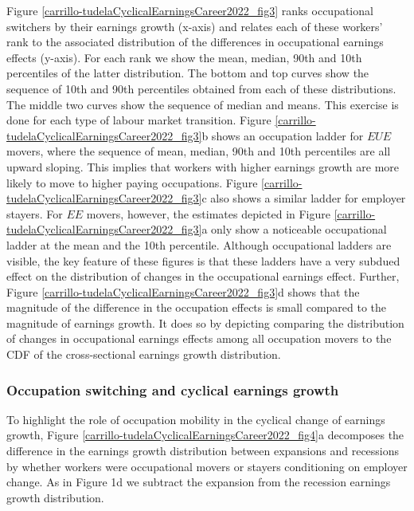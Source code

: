\documentclass[12pt]{article}
\newcommand{\highlightP}[1]{{\emph{\color{MyPink}{#1}}}}
\newcommand{\highlightPP}[1]{{\emph{\color{MyPurple}{#1}}}}
\theoremstyle{definition}
\begin{document}
Figure \ref{carrillo-tudelaCyclicalEarningsCareer2022_fig3} ranks occupational switchers by their earnings growth (x-axis) and relates each of these workers' rank to the associated distribution of the differences in occupational earnings effects (y-axis). For each rank we show the mean, median, 90th and 10th percentiles of the latter distribution. The bottom and top curves show the sequence of 10th and 90th percentiles obtained from each of these distributions. The middle two curves show the sequence of median and means. This exercise is done for each type of labour market transition. Figure \ref{carrillo-tudelaCyclicalEarningsCareer2022_fig3}b shows an occupation ladder for $EUE$ movers, where the sequence of mean, median, 90th and 10th percentiles are all upward sloping. This implies that workers with higher earnings growth are more likely to move to higher paying occupations. Figure \ref{carrillo-tudelaCyclicalEarningsCareer2022_fig3}c also shows a similar ladder for employer stayers. For $EE$ movers, however, the estimates depicted in Figure \ref{carrillo-tudelaCyclicalEarningsCareer2022_fig3}a only show a noticeable occupational ladder at the mean and the 10th percentile. Although occupational ladders are visible, the key feature of these figures is that these ladders have a very subdued effect on the distribution of changes in the occupational earnings effect. \highlightPP{That is, large earnings changes are associated with movements both up or down the occupational ladder across all types of labour market transitions.} Further, Figure \ref{carrillo-tudelaCyclicalEarningsCareer2022_fig3}d shows that the magnitude of the difference in the occupation effects is small compared to the magnitude of earnings growth. It does so by depicting comparing the distribution of changes in occupational earnings effects among all occupation movers to the CDF of the cross-sectional earnings growth distribution. \highlightP{These findings suggest that the more important factor for occupational change is the idiosyncratic motive rather than average occupation-wide earnings differences when explaining the earnings growth distribution.}

\subsubsection{Occupation switching and cyclical earnings growth}

To highlight the role of occupation mobility in the cyclical change of earnings growth, Figure \ref{carrillo-tudelaCyclicalEarningsCareer2022_fig4}a decomposes the difference in the earnings growth distribution between expansions and recessions by whether workers were occupational movers or stayers conditioning on employer change. As in Figure 1d we subtract the expansion from the recession earnings growth distribution.
\end{document}
